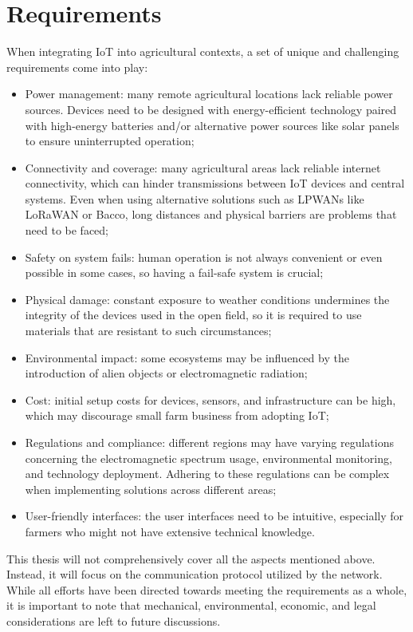 \section{Requirements}
When integrating \gls{IoT} into agricultural contexts, a set of unique and challenging requirements come into play:
\begin{itemize}
    \item Power management: many remote agricultural locations lack reliable power sources. Devices need to be
        designed with energy-efficient technology paired with high-energy batteries and/or alternative power sources
        like solar panels to ensure uninterrupted operation;
    \item Connectivity and coverage: many agricultural areas lack reliable internet connectivity, which can hinder
        transmissions between IoT devices and central systems. Even when using alternative solutions such as
        \glspl{LPWAN} like LoRaWAN or Bacco, long distances and physical barriers are problems that need to be faced;
    \item Safety on system fails: human operation is not always convenient or even possible in
        some cases, so having a fail-safe system is crucial;
    \item Physical damage: constant exposure to weather conditions undermines the integrity of the devices used in the
        open field, so it is required to use materials that are resistant to such circumstances;
    \item Environmental impact: some ecosystems may be influenced by the introduction of alien objects or
        electromagnetic radiation;
    \item Cost: initial setup costs for devices, sensors, and infrastructure can be high, which may discourage small
        farm business from adopting \gls{IoT};
    \item Regulations and compliance: different regions may have varying regulations concerning the electromagnetic
        spectrum usage, environmental monitoring, and technology deployment. Adhering to these regulations can be
        complex when implementing solutions across different areas;
    \item User-friendly interfaces: the user interfaces need to be intuitive, especially for farmers who might not
        have extensive technical knowledge.
\end{itemize}
This thesis will not comprehensively cover all the aspects mentioned above. Instead, it will focus on the
communication protocol utilized by the network. While all efforts have been directed towards meeting the
requirements as a whole, it is important to note that mechanical, environmental, economic, and legal considerations are
left to future discussions.

